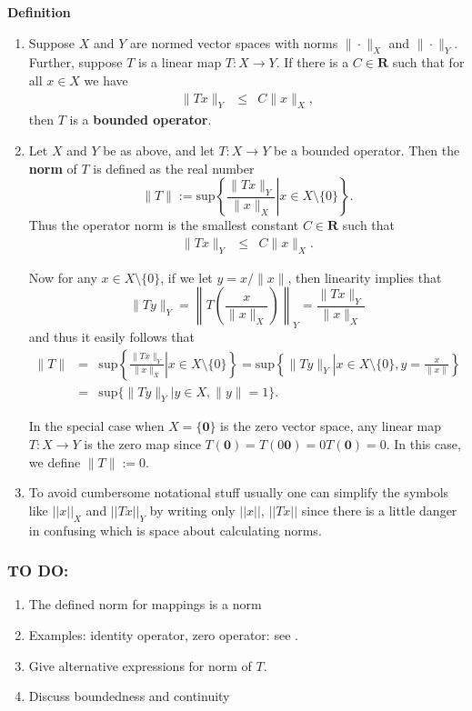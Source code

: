\documentclass[12pt]{article}
\newcounter{123listctr}
\newcounter{123listcolonstylectr}
\begin{document}
{\bf Definition} \cite{kreyszig}
\begin{enumerate}
\item Suppose $X$ and $Y$ are normed vector spaces with norms $\| \cdot \|_X$ and $\| \cdot \|_Y$. Further, suppose $T$ is a linear map
$T : X \to Y$. If there is a $C \in \mathbf{R}$ such that for all $x \in X$ we have
\begin{eqnarray*}
\| Tx \|_Y &\le& C\| x \|_X,
\end{eqnarray*}
then $T$ is a {\bf bounded operator}.
\item Let $X$ and $Y$ be as above, and let $T : X \to Y$ be a bounded
operator. Then the {\bf norm} of $T$ is defined as the real number
$$\| T \| := \mathrm{sup} \left\{ \left. \frac{\| Tx \|_Y}{\| x \|_X} \right| x \in X \setminus \{0\} \right\}.$$ %
Thus the operator norm is the smallest constant $C \in \mathbf{R}$ such that 
\begin{eqnarray*}
\| Tx \|_Y  &\le& C \| x \|_X.
\end{eqnarray*}

Now for any $x \in X \setminus \{0\}$, if we let $y = x/\|x\|$, then linearity implies that
$$\| Ty \|_Y = \left\| T\left(\frac{x}{\| x \|_X}\right) \right\|_Y = \frac{\| Tx \|_Y}{\|x\|_X}$$
and thus it easily follows that
\begin{eqnarray*}
\| T \| &=& \mathrm{sup} \left\{ \left. \frac{\| Tx \|_Y}{\| x \|_X} \right| x \in X \setminus \{0\} \right\} = \mathrm{sup} \left\{ \| Ty \|_Y \left| x \in X \setminus \{0\}, y=\frac{x}{\|x\|} \right. \right\}\\
&=& \mathrm{sup} \{ \| Ty \|_Y | y \in X, \|y\| = 1 \}.
\end{eqnarray*}

In the special case when $X = \{\mathbf{0}\}$ is the zero vector space, any linear
map $T : X \to Y$ is the zero map since $T(\mathbf{0})=T(0\mathbf{0})=0T(\mathbf{0})=0$. In this
case, we define $\|T \| := 0$.

\item To avoid cumbersome notational stuff usually one can simplify the symbols
like $||x||_X$ and $||Tx||_Y$
by writing only $||x||$, $||Tx||$
since there is a little danger in confusing which is space about calculating norms.

\end{enumerate}

\subsubsection{TO DO:}
\begin{enumerate}
\item The defined norm for mappings is a norm
\item Examples: identity operator, zero operator: see \cite{kreyszig}.
\item Give alternative expressions for norm of $T$. \item Discuss boundedness and continuity
\end{enumerate}
\end{document}
